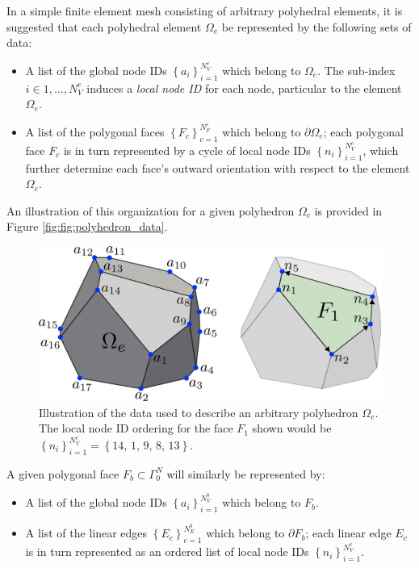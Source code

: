 	In a simple finite element mesh consisting of arbitrary polyhedral elements, it is suggested that each polyhedral element $\Omega_e$ be represented by the following sets of data:
	\begin{itemize}
		\item A list of the global node IDs $\left\{ a_i \right\}_{i=1}^{N^e_V}$ which belong to $\Omega_e$. The sub-index $i \in 1, \ldots, N^e_V$ induces a \textit{local node ID} for each node, particular to the element $\Omega_e$.
		\item A list of the polygonal faces $\left\{ F_{c} \right\}_{c=1}^{N^e_F}$ which belong to $\partial \Omega_e$; each polygonal face $F_c$ is in turn represented by a cycle of local node IDs $\left\{ n_i \right\}_{i=1}^{N^c_V}$, which further determine each face's outward orientation with respect to the element $\Omega_e$.
	\end{itemize}
	An illustration of this organization for a given polyhedron $\Omega_e$ is provided in Figure \ref{fig:fig:polyhedron_data}.
	\begin{figure} [!ht]
		\centering
		\includegraphics[width = 6.0in]{figures/polyhedron_data.pdf}
		\caption{Illustration of the data used to describe an arbitrary polyhedron $\Omega_e$. The local node ID ordering for the face $F_1$ shown would be $\left\{ n_i \right\}_{i=1}^{N^c_V} = \left\{ 14, \, 1, \, 9, \, 8, \, 13 \right\}$.}
		\label{fig:polyhedron_data}
	\end{figure}
	
	A given polygonal face $F_b \subset \Gamma^N_0$ will similarly be represented by:
	\begin{itemize}
		\item A list of the global node IDs $\left\{ a_i \right\}_{i=1}^{N^b_V}$ which belong to $F_b$.
		\item A list of the linear edges $\left\{ E_{c} \right\}_{c=1}^{N^b_E}$ which belong to $\partial F_b$; each linear edge $E_c$ is in turn represented as an ordered list of local node IDs $\left\{ n_i \right\}_{i=1}^{N^c_V}$.
	\end{itemize}
	
